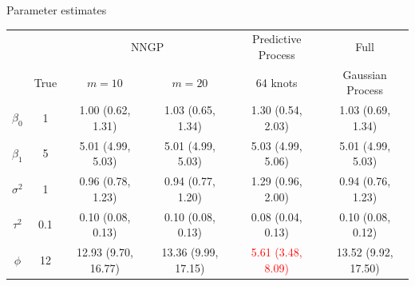 \begin{frame}{Parameter estimates}
	\begin{table}[]
		\centering
		{\tiny
			\begin{tabular}{cccccc}
				\hline
				&       &\multicolumn{2}{c}{NNGP} &Predictive Process &Full\\
				& True            &$m=10$ & $m=20$           &64 knots          & Gaussian Process \\ 
				\hline
				$\beta_{0}$ &1&1.00 (0.62, 1.31)&1.03 (0.65, 1.34)&1.30 (0.54, 2.03)&1.03 (0.69, 1.34)\\ 
				$\beta_{1}$  &5&5.01 (4.99, 5.03)&5.01 (4.99, 5.03)&5.03 (4.99, 5.06)&5.01 (4.99, 5.03)\\ 
				$\sigma^2$  &1&0.96 (0.78, 1.23)&0.94 (0.77, 1.20)&1.29 (0.96, 2.00)&0.94 (0.76, 1.23)\\ 
				$\tau^2$  &0.1&0.10 (0.08, 0.13)&0.10 (0.08, 0.13)&0.08 (0.04, 0.13)&0.10 (0.08, 0.12)\\ 
				$\phi$  &12&12.93 (9.70, 16.77)&13.36 (9.99, 17.15)&\textcolor{red}{5.61 (3.48, 8.09)}&13.52 (9.92, 17.50)\\ 
				\hline
			\end{tabular}
		}
	\end{table}
\end{frame}

